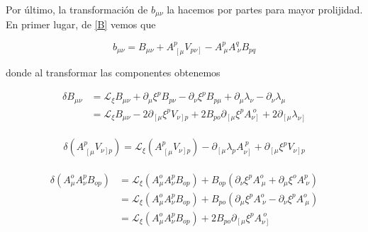 \documentclass{article}
\numberwithin{equation}{section}
\begin{document}
Por último, la transformación de $ b_{\mu \nu} $ la hacemos por partes para mayor prolijidad. En primer lugar, de \ref{B} vemos que 

\begin{equation}\label{aux0}
b_{\mu \nu} = B_{\mu \nu} + A^p_{\ \left[\mu \right.} V_{\left. p \nu \right]} - A^p_{\ \mu}A^q_{\ \nu} B_{p q}
\end{equation}

donde al transformar las componentes obtenemos

\begin{equation}\label{aux1}
\begin{aligned}
\delta B_{\mu \nu} &= \mathcal{L}_{\xi} B_{\mu \nu} + \partial_{\mu} \xi^p B_{p \nu} - \partial_{\nu} \xi^p B_{p \mu} + \partial_{\mu} \lambda_{\nu} - \partial_{\nu} \lambda_{\mu}\\
&= \mathcal{L}_{\xi} B_{\mu \nu} - 2 \partial_{\left[\mu \right.} \xi^p V_{\left. \nu \right] p} + 2 B_{p o} \partial_{\left[\mu \right.} \xi^p A_{\left. \nu \right]}^{\ o} + 2 \partial_{\left[\mu \right.} \lambda_{\left. \nu \right]}
\end{aligned}
\end{equation}\\

\begin{equation}\label{aux2}
\delta \left( A^p_{\ \left[ \mu\right.} V_{\left.\nu \right] p}\right) = \mathcal{L}_{\xi} \left( A^p_{\ \left[ \mu\right.} V_{\left.\nu \right] p}\right) - \partial_{\left[\mu \right.} \lambda_p A_{\left. \nu \right]}^{\ p} + \partial_{\left[\mu \right.} \xi^p V_{\left. \nu \right] p}
\end{equation}\\


\begin{equation}\label{aux3}
\begin{aligned}
\delta \left( A^o_{\mu} A^p_{\nu} B_{o p} \right) &= \mathcal{L}_{\xi} \left( A^o_{\mu} A^p_{\nu} B_{o p} \right) + B_{o p} \left( \partial_{\nu} \xi^p A^o_{\ \mu} + \partial_{\mu} \xi^o A^p_{\ \nu}  \right)\\
&= \mathcal{L}_{\xi} \left( A^o_{\mu} A^p_{\nu} B_{o p} \right) + B_{p o} \left( \partial_{\mu} \xi^p A^o_{\ \nu} - \partial_{\nu} \xi^p A^o_{\ \mu}  \right)\\
&= \mathcal{L}_{\xi} \left( A^o_{\mu} A^p_{\nu} B_{o p} \right) + 2 B_{p o} \partial_{\left[\mu \right.} \xi^p A_{\left. \nu \right]}^{\ o}
\end{aligned}
\end{equation}
 
\end{document}
